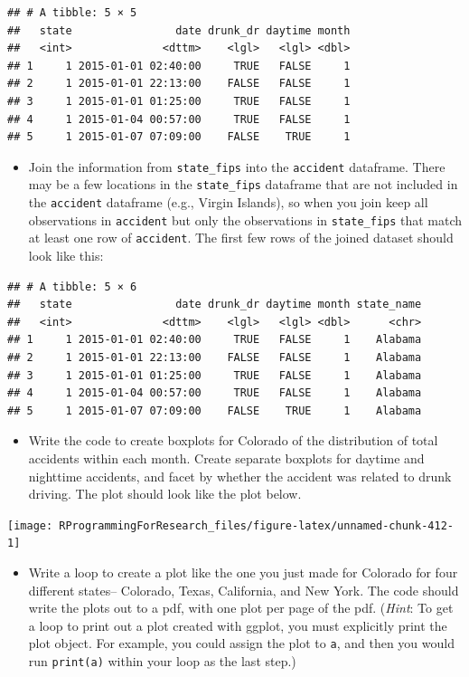\documentclass[]{book}
\providecommand{\tightlist}{%
  \setlength{\itemsep}{0pt}\setlength{\parskip}{0pt}}
\begin{document}
\begin{verbatim}
## # A tibble: 5 × 5
##   state                date drunk_dr daytime month
##   <int>              <dttm>    <lgl>   <lgl> <dbl>
## 1     1 2015-01-01 02:40:00     TRUE   FALSE     1
## 2     1 2015-01-01 22:13:00    FALSE   FALSE     1
## 3     1 2015-01-01 01:25:00     TRUE   FALSE     1
## 4     1 2015-01-04 00:57:00     TRUE   FALSE     1
## 5     1 2015-01-07 07:09:00    FALSE    TRUE     1
\end{verbatim}

\begin{itemize}
\tightlist
\item
  Join the information from \texttt{state\_fips} into the
  \texttt{accident} dataframe. There may be a few locations in the
  \texttt{state\_fips} dataframe that are not included in the
  \texttt{accident} dataframe (e.g., Virgin Islands), so when you join
  keep all observations in \texttt{accident} but only the observations
  in \texttt{state\_fips} that match at least one row of
  \texttt{accident}. The first few rows of the joined dataset should
  look like this:
\end{itemize}

\begin{verbatim}
## # A tibble: 5 × 6
##   state                date drunk_dr daytime month state_name
##   <int>              <dttm>    <lgl>   <lgl> <dbl>      <chr>
## 1     1 2015-01-01 02:40:00     TRUE   FALSE     1    Alabama
## 2     1 2015-01-01 22:13:00    FALSE   FALSE     1    Alabama
## 3     1 2015-01-01 01:25:00     TRUE   FALSE     1    Alabama
## 4     1 2015-01-04 00:57:00     TRUE   FALSE     1    Alabama
## 5     1 2015-01-07 07:09:00    FALSE    TRUE     1    Alabama
\end{verbatim}

\begin{itemize}
\tightlist
\item
  Write the code to create boxplots for Colorado of the distribution of
  total accidents within each month. Create separate boxplots for
  daytime and nighttime accidents, and facet by whether the accident was
  related to drunk driving. The plot should look like the plot below.
\end{itemize}

\begin{center}\texttt{[image: RProgrammingForResearch\_files/figure-latex/unnamed-chunk-412-1]} \end{center}

\begin{itemize}
\tightlist
\item
  Write a loop to create a plot like the one you just made for Colorado
  for four different states-- Colorado, Texas, California, and New York.
  The code should write the plots out to a pdf, with one plot per page
  of the pdf. (\emph{Hint}: To get a loop to print out a plot created
  with ggplot, you must explicitly print the plot object. For example,
  you could assign the plot to \texttt{a}, and then you would run
  \texttt{print(a)} within your loop as the last step.)
\end{itemize}
\end{document}
